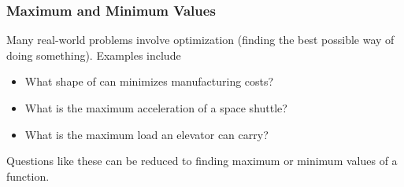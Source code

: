 \begin{frame}
\frametitle{Maximum and Minimum Values}
Many real-world problems involve optimization (finding the best possible way of doing something).  Examples include
\begin{itemize}
\item  What shape of can minimizes manufacturing costs?
\item  What is the maximum acceleration of a space shuttle?
\item  What is the maximum load an elevator can carry?
\end{itemize}
Questions like these can be reduced to finding maximum or minimum values of a function.
\end{frame}

